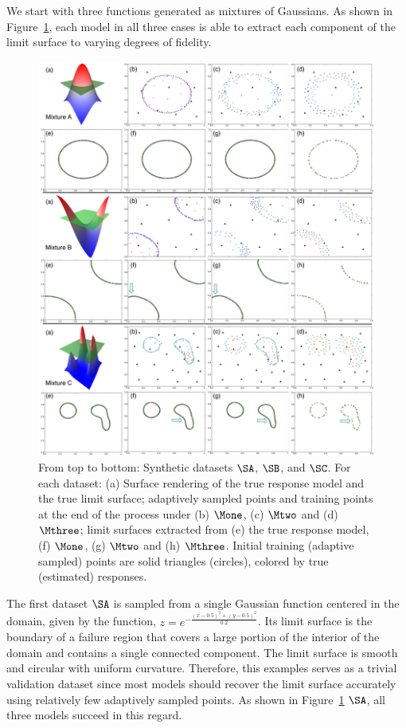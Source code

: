 We start with three functions generated as mixtures of Gaussians.
%
As shown in Figure~\ref{fig:synthetic-A-B-C-GMM}, each model in all three cases is able to extract each component of the limit surface to varying degrees of fidelity.

\begin{figure}[!ht]
\centering
\includegraphics[width=1.0\textwidth]{figs/chap5/synthetic-A-B-C-GMM}
\caption{From top to bottom: Synthetic datasets $\protect\SA$, $\protect\SB$, and $\protect\SC$.
For each dataset: (a) Surface rendering of the true response model and the true limit surface; adaptively sampled points and training points at the end of the process under (b) $\protect\Mone$, (c) $\protect\Mtwo$ and (d) $\protect\Mthree$;
limit surfaces extracted from (e) the true response model, (f) $\protect\Mone$, (g) $\protect\Mtwo$ and (h) $\protect\Mthree$.
Initial training (adaptive sampled) points are solid triangles (circles), colored by true (estimated) responses.
}
\label{fig:synthetic-A-B-C-GMM}
\end{figure}

The first dataset $\SA$ is sampled from a single Gaussian function centered in the domain, given by the function, $z = e^{-\frac{(x-0.5)^2+(y-0.5)^2}{0.2}}$.
%
Its limit surface is the boundary of a failure region that covers a large portion of the interior of the domain and contains a single connected component.
%
The limit surface is smooth and circular with uniform curvature.
%
Therefore, this examples serves as a trivial validation dataset since most models should recover the limit surface accurately using relatively few adaptively sampled points.
%
As shown in Figure~\ref{fig:synthetic-A-B-C-GMM} $\SA$, all three models succeed in this regard.

